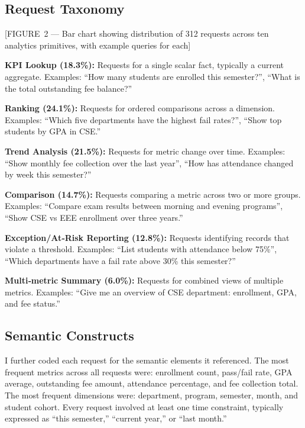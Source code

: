 \documentclass[11pt]{article}
\begin{document}
\subsection{Request Taxonomy}
[FIGURE 2 — Bar chart showing distribution of 312 requests across ten analytics primitives, with example queries for each]

\noindent\textbf{KPI Lookup (18.3\%):} Requests for a single scalar fact, typically a current aggregate. Examples: ``How many students are enrolled this semester?'', ``What is the total outstanding fee balance?''

\noindent\textbf{Ranking (24.1\%):} Requests for ordered comparisons across a dimension. Examples: ``Which five departments have the highest fail rates?'', ``Show top students by GPA in CSE.''

\noindent\textbf{Trend Analysis (21.5\%):} Requests for metric change over time. Examples: ``Show monthly fee collection over the last year'', ``How has attendance changed by week this semester?''

\noindent\textbf{Comparison (14.7\%):} Requests comparing a metric across two or more groups. Examples: ``Compare exam results between morning and evening programs'', ``Show CSE vs EEE enrollment over three years.''

\noindent\textbf{Exception/At‑Risk Reporting (12.8\%):} Requests identifying records that violate a threshold. Examples: ``List students with attendance below 75\%'', ``Which departments have a fail rate above 30\% this semester?''

\noindent\textbf{Multi‑metric Summary (6.0\%):} Requests for combined views of multiple metrics. Examples: ``Give me an overview of CSE department: enrollment, GPA, and fee status.''

\subsection{Semantic Constructs}
I further coded each request for the semantic elements it referenced. The most frequent metrics across all requests were: enrollment count, pass/fail rate, GPA average, outstanding fee amount, attendance percentage, and fee collection total. The most frequent dimensions were: department, program, semester, month, and student cohort. Every request involved at least one time constraint, typically expressed as ``this semester,'' ``current year,'' or ``last month.''
\end{document}
